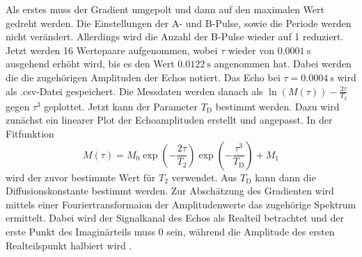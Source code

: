 Als erstes muss der Gradient umgepolt und dann auf den maximalen Wert gedreht werden.
Die Einstellungen der A- und B-Pulse, sowie die Periode werden nicht verändert. 
Allerdings wird die Anzahl der B-Pulse wieder auf 1 reduziert.
Jetzt werden 16 Wertepaare aufgenommen, wobei $\tau$ wieder von 
$\SI{0.0001}{\second}$ ausgehend erhöht wird, bis es den Wert $\SI{0.0122}{\second}$
angenommen hat. Dabei werden die die zugehörigen Amplituden der Echos notiert.
Das Echo bei $\tau = \SI{0.0004}{\second}$ wird als .csv-Datei gespeichert.
Die Messdaten werden danach als $\ln{(M(\tau))}- \frac{2\tau}{T_{\text{2}}}$
gegen $\tau^3$ geplottet.
Jetzt kann der Parameter $T_{\text{D}}$ bestimmt werden. Dazu wird zunächst ein linearer 
Plot der Echoamplituden erstellt und angepasst. In der Fitfunktion 
\begin{equation}
    M(\tau) = M_{\text{0}} \exp{\left( -\frac{2\tau}{T_{\text{2}}} \right)} \exp{\left( -\frac{\tau^3}{T_{\text{D}}} \right)} + M_{\text{1}}
    \label{fit2}
\end{equation}
wird der
zuvor bestimmte Wert für $T_{\text{2}}$ verwendet. Aus $T_{\text{D}}$ kann 
dann die Diffusionskonstante bestimmt werden.
Zur Abschätzung des Gradienten wird mittels einer Fouriertransformaion der 
Amplitudenwerte das zugehörige Spektrum ermittelt. Dabei wird der Signalkanal des 
Echos als Realteil betrachtet und der erste Punkt des Imaginärteils muss 0 sein,
während die Amplitude des ersten Realteilspunkt halbiert wird \cite{anleitung}. 
